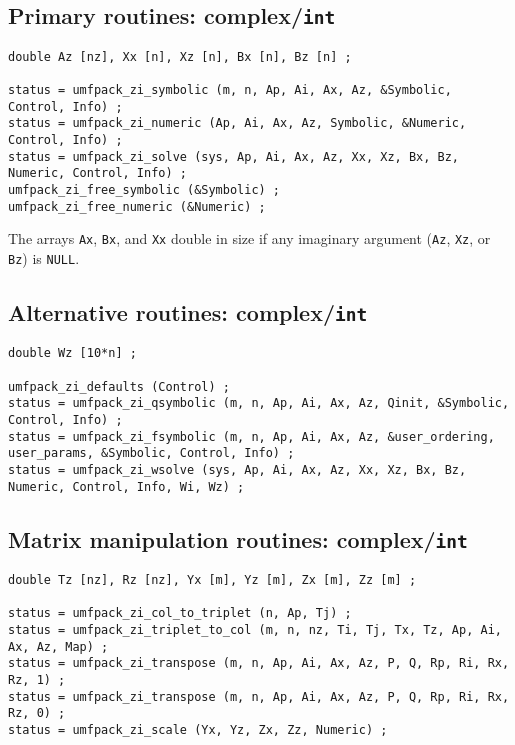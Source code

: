 \documentclass[11pt]{article}
\begin{document}
\subsection{Primary routines: complex/{\tt int}}

{\footnotesize
\begin{verbatim}
double Az [nz], Xx [n], Xz [n], Bx [n], Bz [n] ;

status = umfpack_zi_symbolic (m, n, Ap, Ai, Ax, Az, &Symbolic, Control, Info) ;
status = umfpack_zi_numeric (Ap, Ai, Ax, Az, Symbolic, &Numeric, Control, Info) ;
status = umfpack_zi_solve (sys, Ap, Ai, Ax, Az, Xx, Xz, Bx, Bz, Numeric, Control, Info) ;
umfpack_zi_free_symbolic (&Symbolic) ;
umfpack_zi_free_numeric (&Numeric) ;
\end{verbatim}
}

The arrays {\tt Ax}, {\tt Bx}, and {\tt Xx} double in size if
any imaginary argument ({\tt Az}, {\tt Xz}, or {\tt Bz}) is {\tt NULL}.

\subsection{Alternative routines: complex/{\tt int}}

{\footnotesize
\begin{verbatim}
double Wz [10*n] ;

umfpack_zi_defaults (Control) ;
status = umfpack_zi_qsymbolic (m, n, Ap, Ai, Ax, Az, Qinit, &Symbolic, Control, Info) ;
status = umfpack_zi_fsymbolic (m, n, Ap, Ai, Ax, Az, &user_ordering, user_params, &Symbolic, Control, Info) ;
status = umfpack_zi_wsolve (sys, Ap, Ai, Ax, Az, Xx, Xz, Bx, Bz, Numeric, Control, Info, Wi, Wz) ;
\end{verbatim}
}

\subsection{Matrix manipulation routines: complex/{\tt int}}

{\footnotesize
\begin{verbatim}
double Tz [nz], Rz [nz], Yx [m], Yz [m], Zx [m], Zz [m] ;

status = umfpack_zi_col_to_triplet (n, Ap, Tj) ;
status = umfpack_zi_triplet_to_col (m, n, nz, Ti, Tj, Tx, Tz, Ap, Ai, Ax, Az, Map) ;
status = umfpack_zi_transpose (m, n, Ap, Ai, Ax, Az, P, Q, Rp, Ri, Rx, Rz, 1) ;
status = umfpack_zi_transpose (m, n, Ap, Ai, Ax, Az, P, Q, Rp, Ri, Rx, Rz, 0) ;
status = umfpack_zi_scale (Yx, Yz, Zx, Zz, Numeric) ;
\end{verbatim}
}
\end{document}
